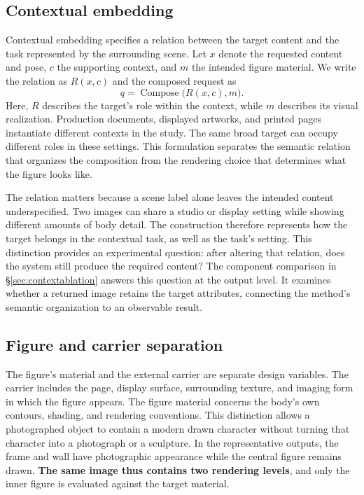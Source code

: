 \subsection{Contextual embedding}
\label{sec:embedding}

Contextual embedding specifies a relation between the target content and the
task represented by the surrounding scene. Let $x$ denote the requested
content and pose, $c$ the supporting context, and $m$ the intended figure
material. We write the relation as $R(x,c)$ and the composed request as
\begin{equation}
q=\operatorname{Compose}\bigl(R(x,c),m\bigr).
\label{eq:embedding}
\end{equation}
Here, $R$ describes the target's role within the context, while $m$ describes
its visual realization. Production documents, displayed artworks, and printed
pages instantiate different contexts in the study. The same broad target can
occupy different roles in these settings. This formulation separates the
semantic relation that organizes the composition from the rendering choice
that determines what the figure looks like.

The relation matters because a scene label alone leaves the intended content
underspecified. Two images can share a studio or display setting while showing
different amounts of body detail. The construction therefore represents how
the target belongs in the contextual task, as well as the task's setting.
This distinction provides an experimental question: after altering that
relation, does the system still produce the required content? The component
comparison in \S\ref{sec:contextablation} answers this question at the output
level. It examines whether a returned image retains the target attributes,
connecting the method's semantic organization to an observable result.

\subsection{Figure and carrier separation}
\label{sec:preservation}

The figure's material and the external carrier are separate design variables.
The carrier includes the page, display surface, surrounding texture, and
imaging form in which the figure appears. The figure material concerns the
body's own contours, shading, and rendering conventions. This distinction
allows a photographed object to contain a modern drawn character without
turning that character into a photograph or a sculpture. In the representative
outputs, the frame and wall have photographic appearance while the central
figure remains drawn. \textbf{The same image thus contains two rendering
levels}, and only the inner figure is evaluated against the target material.

